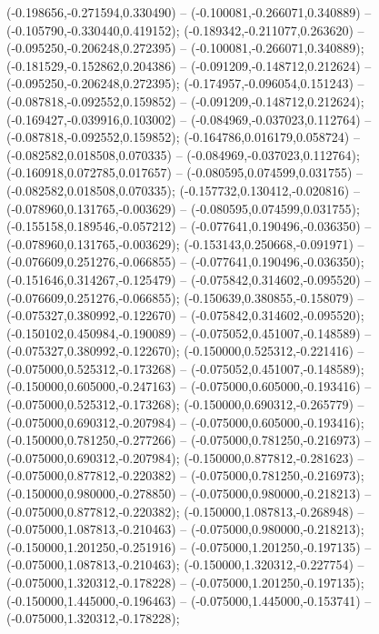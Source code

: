  (-0.198656,-0.271594,0.330490) -- (-0.100081,-0.266071,0.340889) -- (-0.105790,-0.330440,0.419152);
 (-0.189342,-0.211077,0.263620) -- (-0.095250,-0.206248,0.272395) -- (-0.100081,-0.266071,0.340889);
 (-0.181529,-0.152862,0.204386) -- (-0.091209,-0.148712,0.212624) -- (-0.095250,-0.206248,0.272395);
 (-0.174957,-0.096054,0.151243) -- (-0.087818,-0.092552,0.159852) -- (-0.091209,-0.148712,0.212624);
 (-0.169427,-0.039916,0.103002) -- (-0.084969,-0.037023,0.112764) -- (-0.087818,-0.092552,0.159852);
 (-0.164786,0.016179,0.058724) -- (-0.082582,0.018508,0.070335) -- (-0.084969,-0.037023,0.112764);
 (-0.160918,0.072785,0.017657) -- (-0.080595,0.074599,0.031755) -- (-0.082582,0.018508,0.070335);
 (-0.157732,0.130412,-0.020816) -- (-0.078960,0.131765,-0.003629) -- (-0.080595,0.074599,0.031755);
 (-0.155158,0.189546,-0.057212) -- (-0.077641,0.190496,-0.036350) -- (-0.078960,0.131765,-0.003629);
 (-0.153143,0.250668,-0.091971) -- (-0.076609,0.251276,-0.066855) -- (-0.077641,0.190496,-0.036350);
 (-0.151646,0.314267,-0.125479) -- (-0.075842,0.314602,-0.095520) -- (-0.076609,0.251276,-0.066855);
 (-0.150639,0.380855,-0.158079) -- (-0.075327,0.380992,-0.122670) -- (-0.075842,0.314602,-0.095520);
 (-0.150102,0.450984,-0.190089) -- (-0.075052,0.451007,-0.148589) -- (-0.075327,0.380992,-0.122670);
 (-0.150000,0.525312,-0.221416) -- (-0.075000,0.525312,-0.173268) -- (-0.075052,0.451007,-0.148589);
 (-0.150000,0.605000,-0.247163) -- (-0.075000,0.605000,-0.193416) -- (-0.075000,0.525312,-0.173268);
 (-0.150000,0.690312,-0.265779) -- (-0.075000,0.690312,-0.207984) -- (-0.075000,0.605000,-0.193416);
 (-0.150000,0.781250,-0.277266) -- (-0.075000,0.781250,-0.216973) -- (-0.075000,0.690312,-0.207984);
 (-0.150000,0.877812,-0.281623) -- (-0.075000,0.877812,-0.220382) -- (-0.075000,0.781250,-0.216973);
 (-0.150000,0.980000,-0.278850) -- (-0.075000,0.980000,-0.218213) -- (-0.075000,0.877812,-0.220382);
 (-0.150000,1.087813,-0.268948) -- (-0.075000,1.087813,-0.210463) -- (-0.075000,0.980000,-0.218213);
 (-0.150000,1.201250,-0.251916) -- (-0.075000,1.201250,-0.197135) -- (-0.075000,1.087813,-0.210463);
 (-0.150000,1.320312,-0.227754) -- (-0.075000,1.320312,-0.178228) -- (-0.075000,1.201250,-0.197135);
 (-0.150000,1.445000,-0.196463) -- (-0.075000,1.445000,-0.153741) -- (-0.075000,1.320312,-0.178228);
